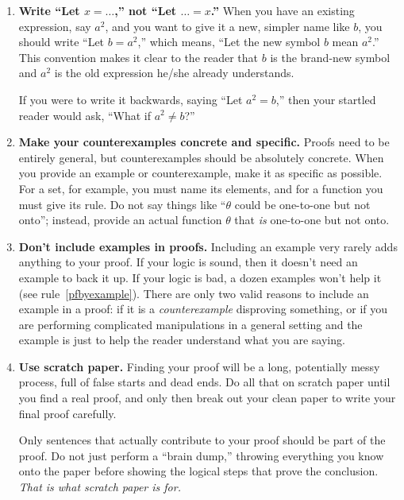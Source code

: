 \begin{enumerate}
\item \textbf{Write ``Let $x=\dots$,'' not ``Let $\dots=x$.''} 
        When you have an existing expression, say $a^{2}$,
        and you want to give it a new, simpler name like $b$,
        you should write ``Let $b=a^{2}$,''
        which means, ``Let the new symbol $b$ mean $a^{2}$.''
        This convention makes it clear to the reader that $b$ is the brand-new symbol
        and $a^{2}$ is the old expression he/she already understands.
        
        If you were to write it backwards, saying ``Let $a^{2}=b$,''
        then your startled reader would ask,
        ``What if $a^{2}\neq b$?''
  
\item \textbf{Make your counterexamples concrete and specific.}
        Proofs need to be entirely general,
        but counterexamples should be absolutely concrete.
        When you provide an example or counterexample,
        make it as specific as possible.
        For a set, for example, you must name its elements,
        and for a function you must give its rule.
        Do not say things like ``$\theta$ could be one-to-one but not onto'';
        instead, provide an actual function $\theta$ that \emph{is} one-to-one but not onto.
    
\item \textbf{Don't include examples in proofs.}
        Including an example very rarely adds anything to your proof.
        If your logic is sound, then it doesn't need an example to back it up.
        If your logic is bad, a dozen examples won't help it (see rule~\ref{pfbyexample}).
        There are only two valid reasons to include an example in a proof:
        if it is a \emph{counterexample} disproving something,
        or if you are performing complicated manipulations in a general setting
        and the example is just to help the reader understand what you are saying.

 \item \textbf{Use scratch paper.}
        Finding your proof will be a long, potentially messy process, 
        full of false starts and dead ends.
        Do all that on scratch paper
        until you find a real proof,
        and only then break out your clean paper to write your final proof carefully.
        
        Only sentences that actually contribute to your proof 
        should be part of the proof.
        Do not just perform a ``brain dump,''
        throwing everything you know onto the paper
        before showing the logical steps that prove the conclusion.
        \emph{That is what scratch paper is for.}

\end{enumerate}